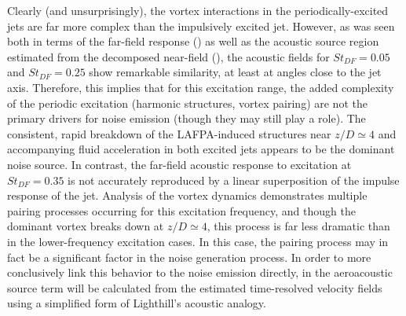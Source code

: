 Clearly (and unsurprisingly), the vortex interactions in the periodically-excited jets are far more complex than the impulsively excited jet.
However, as was seen both in terms of the far-field response () as well as the acoustic source region estimated from the decomposed near-field (), the acoustic fields for $St_{DF}=0.05$ and $St_{DF}=0.25$ show remarkable similarity, at least at angles close to the jet axis.
Therefore, this implies that for this excitation range, the added complexity of the periodic excitation (harmonic structures, vortex pairing) are not the primary drivers for noise emission (though they may still play a role).
The consistent, rapid breakdown of the LAFPA-induced structures near $z/D \simeq 4$ and accompanying fluid acceleration in both excited jets appears to be the dominant noise source. 
In contrast, the far-field acoustic response to excitation at $St_{DF}=0.35$ is not accurately reproduced by a linear superposition of the impulse response of the jet.
Analysis of the vortex dynamics demonstrates multiple pairing processes occurring for this excitation frequency, and though the dominant vortex breaks down at $z/D \simeq 4$, this process is far less dramatic than in the lower-frequency excitation cases.
In this case, the pairing process may in fact be a significant factor in the noise generation process.
In order to more conclusively link this behavior to the noise emission directly, in  the aeroacoustic source term will be calculated from the estimated time-resolved velocity fields using a simplified form of Lighthill's acoustic analogy.